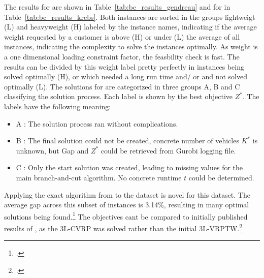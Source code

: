 The results for \gendreauDataSetText are shown in Table~\ref{tab:bc_results_gendreau} and for \krebsADataSetText in Table~\ref{tab:bc_results_krebs}.
Both instances are sorted in the groups lightweigt (L) and heavyweight (H) labeled by the instance names, indicating if the average weight
requested by a customer is above (H) or under (L) the average of all instances, indicating the complexity to solve the instances optimally.
As weight is a one dimensional loading constraint factor, the feasbility check is fast. The results can be divided by this weight label
pretty perfectly in instances being solved optimally (H), or which needed a long run time and/ or and not solved optimally (L).
The solutions for \krebsADataSetText are categorized in three groups A, B and C classifying the solution process. Each label is shown
by the best objective $Z^*$. The labels have the following meaning:
\begin{itemize}
	\item A : The solution process ran without complications.
	\item B : The final solution could not be created, concrete number of vehicles $K^*$ is unknown, but Gap and $Z^*$ could be retrieved from Gurobi logging file.
	\item C : Only the start solution was created, leading to missing values for the main branch-and-cut algorithm. No concrete runtime $t$ could be determined.
\end{itemize}

Applying the exact algorithm from \cite{tamke_branch-and-cut_2024} to the \krebsADataSetText dataset is novel for this dataset.
The average gap across this subset of instances is 3.14\%, resulting in many optimal solutions being found.\footcite[cf.][]{tamke_branch-and-cut_2024}
The objectives cant be compared to initially published results of \cite{krebs_advanced_2021}, as the \gls{3L-CVRP} was solved rather than the initial \gls{3L-VRPTW}.\footcite[cf.][pp. 858–864]{krebs_advanced_2021}

